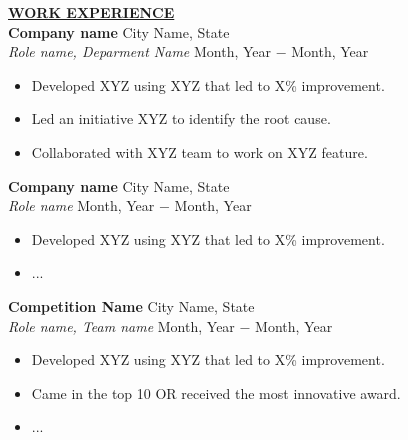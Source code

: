 \documentclass{article}
\begin{document}
	\noindent \textbf{\underline{WORK EXPERIENCE}} \\
	\noindent \textbf{Company name} \hfill City Name, State \\
	\textit{Role name, Deparment Name} \hfill Month, Year $-$ Month, Year
	\begin{itemize}[noitemsep,nolistsep,leftmargin=*]
		\item {Developed XYZ using XYZ that led to X\% improvement.}
		\item {Led an initiative XYZ to identify the root cause.}
		\item {Collaborated with XYZ team to work on XYZ feature. \\}
	\end{itemize}
	
	\noindent \textbf{Company name} \hfill City Name, State \\
	\textit{Role name} \hfill Month, Year $-$ Month, Year
	\begin{itemize}[noitemsep,nolistsep,leftmargin=*]
		\item {Developed XYZ using XYZ that led to X\% improvement.}
		\item {... \\}
	\end{itemize}
	
	\noindent \textbf{Competition Name} \hfill City Name, State \\
	\textit{Role name, Team name} \hfill Month, Year $-$ Month, Year
	\begin{itemize}[noitemsep,nolistsep,leftmargin=*]
		\item {Developed XYZ using XYZ that led to X\% improvement.}
		\item{Came in the top 10 OR received the most innovative award.}
		\item {... \\}
	\end{itemize}
	
\end{document}
